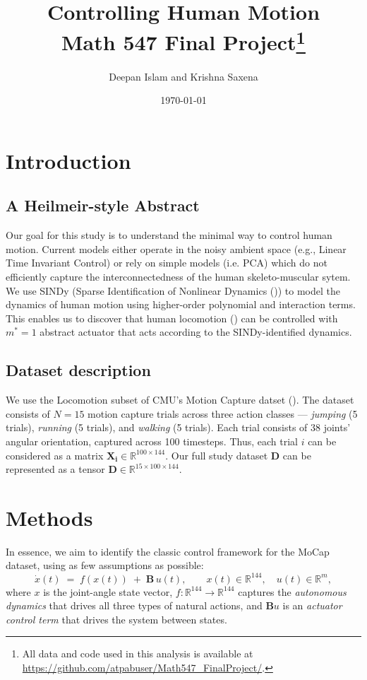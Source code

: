 \documentclass[11pt]{article}
\title{Controlling Human Motion\\[0.5em]\large Math 547 Final Project\footnote{All data and code used in this analysis is available at \href{https://github.com/atpabuser/Math547\_FinalProject/}{https://github.com/atpabuser/Math547\_FinalProject/}.}}
\author{Deepan Islam and Krishna Saxena}
\date{\today}
\begin{document}
\maketitle
\space

\section{Introduction}

\subsection{A Heilmeir-style Abstract}
Our goal for this study is to understand the minimal way to control human motion.
Current models either operate in the noisy ambient space (e.g., Linear Time Invariant Control) or rely on simple models (i.e. PCA) which do not efficiently capture the interconnectedness of the human skeleto-muscular sytem.
We use SINDy (Sparse Identification of Nonlinear Dynamics (\cite{brunton2016})) to model the dynamics of human motion using higher-order polynomial and interaction terms.
This enables us to discover that human locomotion (\cite{mocapData}) can be controlled with $m^* = 1$ abstract actuator that acts according to the SINDy-identified dynamics.


\subsection{Dataset description}

We use the Locomotion subset of CMU's Motion Capture datset (\cite{mocapData}).
The dataset consists of $N=15$ motion capture trials across three action classes
--- \textit{jumping} (5 trials), \textit{running} (5 trials), and \textit{walking}
(5 trials).
Each trial consists of 38 joints' angular orientation, captured across 100 timesteps.
Thus, each trial $i$ can be considered as a matrix $\mathbf{X_i} \in \mathbb{R}^{100 \times 144}$.  
Our full study dataset $\mathbf{D}$ can be represented as a tensor $\mathbf{D} \in \mathbb{R}^{15 \times 100 \times 144}$.


\section{Methods}
In essence, we aim to identify the classic control framework for the MoCap dataset, using as few assumptions as possible:
\begin{equation}\label{eq:framework}
  \dot{x}(t) \;=\; f(x(t)) \;+\; \mathbf{B}\,u(t),
  \qquad x(t)\in\mathbb{R}^{144},\quad u(t)\in\mathbb{R}^m,
\end{equation}
where $x$ is the joint-angle state vector, $f:\mathbb{R}^{144} \to\mathbb{R}^{144}$ captures the
\emph{autonomous dynamics} that drives all three types of natural actions, and $\mathbf{B}u$ is
an \emph{actuator control term} that drives the system between states.
\end{document}
